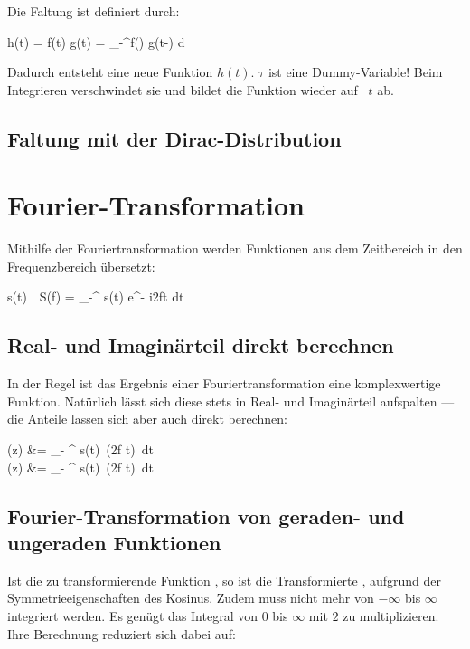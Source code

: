 \documentclass[12pt, a4paper]{scrartcl}
\newenvironment{mathframed}{\empheq[box={\fbox}]{align*}}{\endempheq}
\renewcommand{\im}{\textcolor{myred}{i}}
\begin{document}
Die Faltung ist definiert durch:

\begin{mathframed}
  h(t) = f(t) \star g(t) = \int_{-\infty}^{\infty}f(\tau) \cdot g(t-\tau) d \tau
\end{mathframed}

Dadurch entsteht eine neue Funktion \(h(t)\). \(\tau\) ist eine Dummy-Variable! Beim Integrieren verschwindet sie und bildet die Funktion wieder auf~ \(t\) ab.

\subsection{Faltung mit der Dirac-Distribution}

\section{Fourier-Transformation}

Mithilfe der Fouriertransformation werden Funktionen aus dem Zeitbereich in den Frequenzbereich übersetzt:

\begin{mathframed}
  s(t)~\laplace~S(f) = \int_{-\infty}^{\infty} s(t) e^{- \im 2\pi ft} dt
\end{mathframed}

\subsection{Real- und Imaginärteil direkt berechnen}

In der Regel ist das Ergebnis einer Fouriertransformation eine komplexwertige Funktion. Natürlich lässt sich diese stets in Real- und Imaginärteil aufspalten --- die Anteile lassen sich aber auch direkt berechnen:

\begin{mathframed}
   (z) &= \int_{- \infty}^{\infty} s(t)\ \cos (2\pi f t)\ dt\\[1em]
   (z) &= \int_{- \infty}^{\infty} s(t)\ \sin (2\pi f t)\ dt
\end{mathframed}

\clearpage

\subsection{Fourier-Transformation von geraden- und ungeraden Funktionen}

Ist die zu transformierende Funktion , so ist die Transformierte , aufgrund der Symmetrieeigenschaften des Kosinus. Zudem muss nicht mehr von \(- \infty\) bis \(\infty\) integriert werden. Es genügt das Integral von \(0\) bis \(\infty\) mit \(2\) zu multiplizieren. Ihre Berechnung reduziert sich dabei auf:
\end{document}
